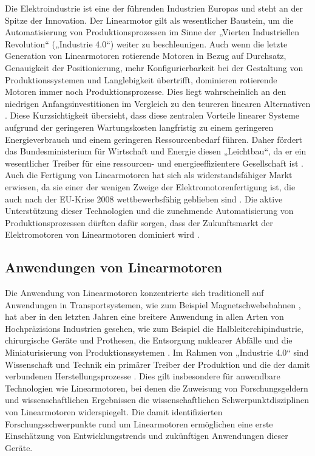 \documentclass[
  oneside]{book}
\begin{document}
Die Elektroindustrie ist eine der führenden Industrien Europas und steht an der Spitze der Innovation. Der Linearmotor gilt als wesentlicher Baustein, um die Automatisierung von Produktionsprozessen im Sinne der „Vierten Industriellen Revolution`` („Industrie 4.0``) \citep{baskutis2018} weiter zu beschleunigen. Auch wenn die letzte Generation von Linearmotoren rotierende Motoren in Bezug auf Durchsatz, Genauigkeit der Positionierung, mehr Konfigurierbarkeit bei der Gestaltung von Produktionssystemen und Langlebigkeit übertrifft, dominieren rotierende Motoren immer noch Produktionsprozesse. Dies liegt wahrscheinlich an den niedrigen Anfangsinvestitionen im Vergleich zu den teureren linearen Alternativen \citep{gieras2018}. Diese Kurzsichtigkeit übersieht, dass diese zentralen Vorteile linearer Systeme aufgrund der geringeren Wartungskosten langfristig zu einem geringeren Energieverbrauch und einem geringeren Ressourcenbedarf führen. Daher fördert das Bundesministerium für Wirtschaft und Energie diesen „Leichtbau``, da er ein wesentlicher Treiber für eine ressourcen- und energieeffizientere Gesellschaft ist \citep{bundesministeriumfurwirtschaftundenergie2021}. Auch die Fertigung von Linearmotoren hat sich als widerstandsfähiger Markt erwiesen, da sie einer der wenigen Zweige der Elektromotorenfertigung ist, die auch nach der EU-Krise 2008 wettbewerbsfähig geblieben sind \citep{ecsip2016}. Die aktive Unterstützung dieser Technologien und die zunehmende Automatisierung von Produktionsprozessen dürften dafür sorgen, dass der Zukunftsmarkt der Elektromotoren von Linearmotoren dominiert wird \citep{gieras2018}.

\hypertarget{anwendungen-von-linearmotoren}{%
\subsection{Anwendungen von Linearmotoren}\label{anwendungen-von-linearmotoren}}

Die Anwendung von Linearmotoren konzentrierte sich traditionell auf Anwendungen in Transportsystemen, wie zum Beispiel Magnetschwebebahnen \citep[z. B. ``Maglev'':][]{cassat2003, palka2021}, hat aber in den letzten Jahren eine breitere Anwendung in allen Arten von Hochpräzisions Industrien gesehen, wie zum Beispiel die Halbleiterchipindustrie, chirurgische Geräte und Prothesen, die Entsorgung nuklearer Abfälle und die Miniaturisierung von Produktionssystemen \citetext{\citealp[ \citet{razali2013}]{malaize2009}; \citealp{raiola2019}; \citealp{fromme2019}}. Im Rahmen von „Industrie 4.0`` sind Wissenschaft und Technik ein primärer Treiber der Produktion und die der damit verbundenen Herstellungsprozesse \citep{baskutis2018}. Dies gilt insbesondere für anwendbare Technologien wie Linearmotoren, bei denen die Zuweisung von Forschungsgeldern und wissenschaftlichen Ergebnissen die wissenschaftlichen Schwerpunktdisziplinen von Linearmotoren widerspiegelt. Die damit identifizierten Forschungsschwerpunkte rund um Linearmotoren ermöglichen eine erste Einschätzung von Entwicklungstrends und zukünftigen Anwendungen dieser Geräte.
\end{document}
